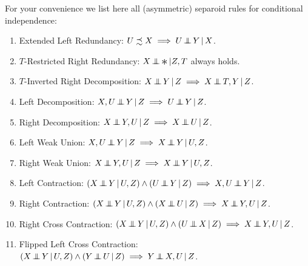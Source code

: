 \bigskip
For your convenience we list here all (asymmetric) separoid rules for conditional independence:
\begin{enumerate}
	\item Extended Left Redundancy: 
        $U \precsim X \implies U \Indep  Y \given X$.
    \item $T$-Restricted Right Redundancy:
        $X\Indep \Asterisk|Z,T$ always holds.
    \item $T$-Inverted Right Decomposition:
        $X \Indep  Y \given Z \implies X \Indep  T, Y \given Z$.
	\item Left Decomposition:  
        $X,U \Indep  Y \given Z \implies U \Indep  Y \given Z$.
  \item Right Decomposition:  	
        $X \Indep  Y,U \given Z \implies X \Indep  U \given Z$.
    \item Left Weak Union:
        $X , U \Indep  Y  \given Z \implies X \Indep  Y \given U , Z$.
  \item Right Weak Union: 
      $X \Indep  Y , U \given Z \implies X \Indep  Y \given U , Z$.
\item Left Contraction:
 $ (X \Indep  Y \given U , Z) \land (U \Indep  Y \given Z) \implies X , U \Indep  Y \given Z$.
\item Right Contraction:
    $ (X \Indep  Y \given U , Z) \land (X \Indep  U \given Z)  \implies X \Indep  Y , U \given Z$.
\item Right Cross Contraction:
    $ (X \Indep  Y \given U , Z) \land (U \Indep  X \given Z) \implies X  \Indep  Y , U \given Z$.
\item Flipped Left Cross Contraction: 
    $ (X \Indep  Y \given U , Z) \land (Y \Indep  U \given Z) \implies Y \Indep  X , U \given Z$.
\end{enumerate}

